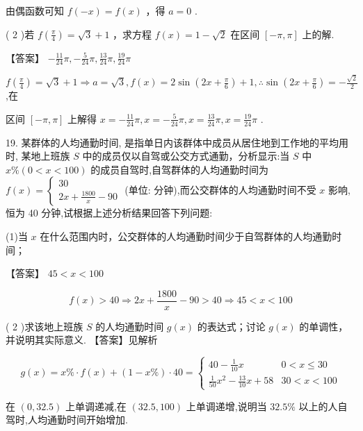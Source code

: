 \documentclass[10pt]{article}
\begin{document}
由偶函数可知 \(f\left( {-x}\right)  = f\left( x\right)\) ，得 \(a = 0\) .

( 2 )若 \(f\left( \frac{\pi }{4}\right)  = \sqrt{3} + 1\) ，求方程 \(f\left( x\right)  = 1 - \sqrt{2}\) 在区间 \(\left\lbrack  {-\pi ,\pi }\right\rbrack\) 上的解.

【答案】 \(- \frac{11}{24}\pi , - \frac{5}{24}\pi ,\frac{13}{24}\pi ,\frac{19}{24}\pi\)

\(f\left( \frac{\pi }{4}\right)  = \sqrt{3} + 1 \Rightarrow  a = \sqrt{3},f\left( x\right)  = 2\sin \left( {{2x} + \frac{\pi }{6}}\right)  + 1,\therefore \sin \left( {{2x} + \frac{\pi }{6}}\right)  =  - \frac{\sqrt{2}}{2}\) ,在

区间 \(\left\lbrack  {-\pi ,\pi }\right\rbrack\) 上解得 \(x =  - \frac{11}{24}\pi ,x =  - \frac{5}{24}\pi ,x = \frac{13}{24}\pi ,x = \frac{19}{24}\pi\) .

19. 某群体的人均通勤时间, 是指单日内该群体中成员从居住地到工作地的平均用时, 某地上班族 \(S\) 中的成员仅以自驾或公交方式通勤，分析显示:当 \(S\) 中 \(x\% \left( {0 < x < {100}}\right)\) 的成员自驾时,自驾群体的人均通勤时间为 \(f\left( x\right)  = \left\{  \begin{array}{l} {30} \\  {2x} + \frac{1800}{x} - {90} \end{array}\right.\) (单位: 分钟),而公交群体的人均通勤时间不受 \(x\) 影响,恒为 40 分钟,试根据上述分析结果回答下列问题:

(1)当 \(x\) 在什么范围内时，公交群体的人均通勤时间少于自驾群体的人均通勤时间；

【答案】 \({45} < x < {100}\)

\[
f\left( x\right)  > {40} \Rightarrow  {2x} + \frac{1800}{x} - {90} > {40} \Rightarrow  {45} < x < {100}
\]

( 2 )求该地上班族 \(S\) 的人均通勤时间 \(g\left( x\right)\) 的表达式；讨论 \(g\left( x\right)\) 的单调性，并说明其实际意义. 【答案】见解析

\[
g\left( x\right)  = x\%  \cdot  f\left( x\right)  + \left( {1 - x\% }\right)  \cdot  {40} = \left\{  \begin{matrix} {40} - \frac{1}{10}x & 0 < x \leq  {30} \\  \frac{1}{50}{x}^{2} - \frac{13}{10}x + {58} & {30} < x < {100} \end{matrix}\right.
\]

在 \(\left( {0,{32.5}}\right)\) 上单调递减,在 \(\left( {{32.5},{100}}\right)\) 上单调递增,说明当 \({32.5}\%\) 以上的人自驾时,人均通勤时间开始增加.
\end{document}
